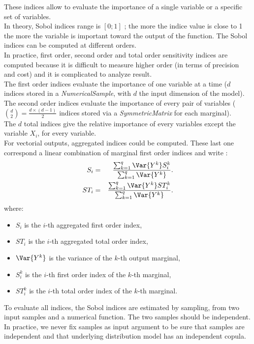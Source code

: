 These indices allow to evaluate the importance of a single variable or a specific set of variables. \\
In theory, Sobol indices range is $\left[0; 1\right]$ ; the more the indice value is close to 1 the more the variable is important toward the output of the function. The Sobol indices can be computed at different orders.\\
In practice, first order, second order and total order sensitivity indices are computed because it is difficult to measure higher order (in terms of precision and cost) and it is complicated to analyze result.\\
The first order indices evaluate the importance of one variable at a time ($d$ indices stored in a {\itshape NumericalSample}, with $d$ the input dimension of the model).\\
The second order indices evaluate the importance of every pair of variables ($\binom{d}{2} = \frac{d \times \left( d-1\right) }{2}$ indices stored via a {\itshape SymmetricMatrix} for each marginal).\\
The $d$ total indices give the relative importance of every variables except the variable $X_i$, for every variable.\\
For vectorial outputs, aggregated indices could be computed. These last one correspond a linear combination of marginal first order indices and write :
\begin{eqnarray}
 S_i & = & \frac{\sum_{k=1}^{q} \Var{Y^k} S_{i}^{k}}{\sum_{k=1}^{q} \Var{Y^k}}.\\
 ST_i & = & \frac{\sum_{k=1}^{q} \Var{Y^k} ST_{i}^{k}}{\sum_{k=1}^{q} \Var{Y^k} }.
\end{eqnarray}
where:
\begin{itemize}
 \item $S_i$ is the $i$-th aggregated first order index,
 \item $ST_i$ is the $i$-th aggregated total order index,
 \item $\Var{Y^k}$ is the variance of the $k$-th output marginal,
 \item $S_i^k$ is the $i$-th first order index of the $k$-th marginal,
 \item $ST_i^k$ is the $i$-th total order index of the $k$-th marginal.
\end{itemize}

To evaluate all indices, the Sobol indices are estimated by sampling, from two input samples and a numerical function. The two samples should be independent. In practice, we never fix samples as input argument to be sure that samples are independent and that underlying distribution model has an independent copula.\\

